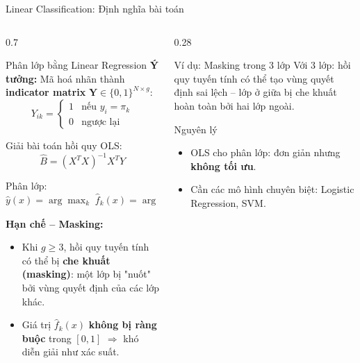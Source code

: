 
\begin{frame}[shrink=40]{Linear Classification: Định nghĩa bài toán}
    \begin{columns}[T]
        \begin{column}{0.7\textwidth}
            \begin{block}{Phân lớp bằng Linear Regression}
                \textbf{Ý tưởng:} Mã hoá nhãn thành \textbf{indicator matrix} $\mathbf{Y} \in \{0,1\}^{N \times g}$:
                $$ Y_{ik} = \begin{cases} 1 & \text{nếu } y_i = \pi_k \\ 0 & \text{ngược lại} \end{cases} $$

                \vspace{0.2cm}
                Giải bài toán hồi quy OLS:
                $$ \hat{B} = (X^TX)^{-1}X^TY $$

                Phân lớp: $\hat{y}(x) = \arg\max_k \; \hat{f}_k(x) = \arg\max_k \; x^T\hat{\beta}_k$

                \vspace{0.3cm}
                \textbf{Hạn chế -- Masking:}
                \begin{itemize}
                    \item Khi $g \geq 3$, hồi quy tuyến tính có thể bị \textbf{che khuất (masking)}: một lớp bị "nuốt" bởi vùng quyết định của các lớp khác.
                    \item Giá trị $\hat{f}_k(x)$ \textbf{không bị ràng buộc} trong $[0,1]$ $\Rightarrow$ khó diễn giải như xác suất.
                \end{itemize}
            \end{block}
        \end{column}

        \begin{column}{0.28\textwidth}
            \begin{exampleblock}{Ví dụ: Masking trong 3 lớp}
                Với 3 lớp: hồi quy tuyến tính có thể tạo vùng quyết định sai lệch -- lớp ở giữa bị che khuất hoàn toàn bởi hai lớp ngoài.
            \end{exampleblock}

            \begin{alertblock}{Nguyên lý}
                \begin{itemize}
                    \item OLS cho phân lớp: đơn giản nhưng \textbf{không tối ưu}.
                    \item Cần các mô hình chuyên biệt: Logistic Regression, SVM.
                \end{itemize}
            \end{alertblock}
        \end{column}
    \end{columns}
\end{frame}

